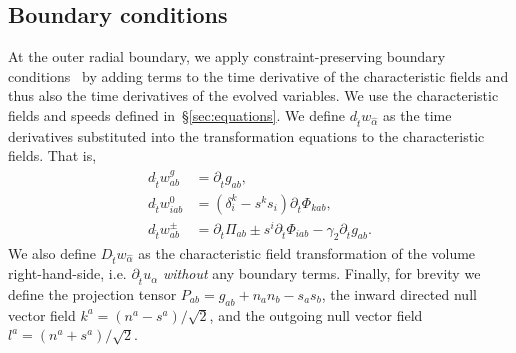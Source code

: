 \begin{bibunit}[unsrtnat]
\subsection{Boundary conditions\label{sec:boundary conditions}}

At the outer radial boundary, we apply constraint-preserving boundary
conditions~\cite{Lindblom:2005qh, Rinne:2007ui} by adding terms to the time
derivative of the characteristic fields and thus also the time derivatives of
the evolved variables. We use the characteristic fields and speeds defined
in~\S\ref{sec:equations}. We define $d_{\hat{t}} w_{\hat{\alpha}}$ as the time
derivatives substituted into the transformation equations to the characteristic
fields. That is,
\begin{eqnarray}
  \label{eq:fosh gh dtw g}
  d_{\hat{t}}w^{g}_{ab} &= \partial_{\hat{t}} g_{ab}, \\
  \label{eq:fosh gh dtw 0}
  d_{\hat{t}} w^{0}_{iab} &= (\delta^k_i-s^k s_i)\partial_{\hat{t}} \Phi_{kab},
  \\
  \label{eq:fosh gh dtw pm}
  d_{\hat{t}} w^{\pm}_{ab} &= \partial_{\hat{t}} \Pi_{ab}\pm
                             s^i\partial_{\hat{t}} \Phi_{iab}
                             -\gamma_2\partial_{\hat{t}} g_{ab}.
\end{eqnarray}
We also define $D_{\hat{t}} w_{\hat{\alpha}}$ as the characteristic field
transformation of the volume right-hand-side, i.e. $\partial_{\hat{t}} u_\alpha$
\textit{without} any boundary terms. Finally, for brevity we define the
projection tensor $P_{ab}=g_{ab}+n_a n_b-s_as_b$, the inward directed null
vector field $k^a=(n^a-s^a)/\sqrt{2}$, and the outgoing null vector field
$l^a=(n^a+s^a)/\sqrt{2}$.


\end{bibunit}
